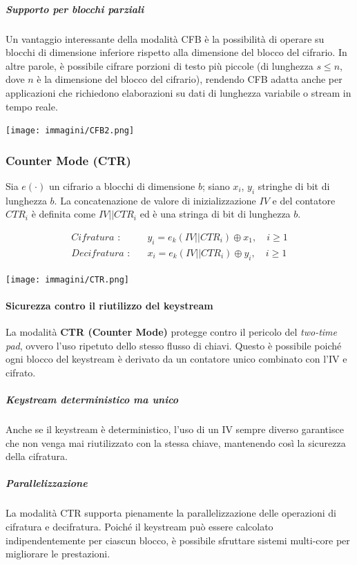 \documentclass{report}
\begin{document}
\subparagraph{Supporto per blocchi parziali}
Un vantaggio interessante della modalità CFB è la possibilità di operare su blocchi di dimensione inferiore rispetto alla dimensione del blocco del cifrario. In altre parole, è possibile cifrare porzioni di testo più piccole (di lunghezza \( s \leq n \), dove \( n \) è la dimensione del blocco del cifrario), rendendo CFB adatta anche per applicazioni che richiedono elaborazioni su dati di lunghezza variabile o stream in tempo reale.

\texttt{[image: immagini/CFB2.png]}

\subsubsection{Counter Mode (CTR)}

Sia \(e(\cdot)\) un cifrario a blocchi di dimensione \(b\); siano \(x_i\), \(y_i\)  stringhe di bit di lunghezza \(b\). La concatenazione de valore di inizializzazione \(IV\) e del contatore $CTR_i$ è definita come \(IV || CTR_i\) ed è una stringa di bit di lunghezza \(b\).

\begin{align*}
\textit{Cifratura :} \quad & y_i = e_k(IV||CTR_i) \oplus x_1, \quad i\geq 1 \\
\textit{Decifratura :} \quad & x_i = e_k(IV || CTR_i) \oplus y_i, \quad i \geq 1
\end{align*}

\texttt{[image: immagini/CTR.png]}

\paragraph{Sicurezza contro il riutilizzo del keystream} 
La modalità \textbf{CTR (Counter Mode)} protegge contro il pericolo del \textit{two-time pad}, ovvero l'uso ripetuto dello stesso flusso di chiavi. Questo è possibile poiché ogni blocco del keystream è derivato da un contatore unico combinato con l'IV e cifrato.

\subparagraph{Keystream deterministico ma unico} 
Anche se il keystream è deterministico, l'uso di un IV sempre diverso garantisce che non venga mai riutilizzato con la stessa chiave, mantenendo così la sicurezza della cifratura.

\subparagraph{Parallelizzazione} 
La modalità CTR supporta pienamente la parallelizzazione delle operazioni di cifratura e decifratura. Poiché il keystream può essere calcolato indipendentemente per ciascun blocco, è possibile sfruttare sistemi multi-core per migliorare le prestazioni.
\end{document}
